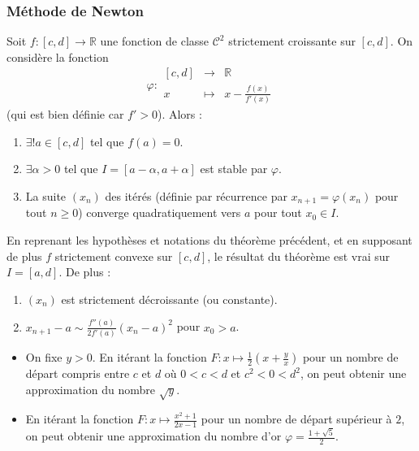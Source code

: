   \subsubsection{Méthode de Newton}


  \begin{theorem}
    Soit $f : [c, d] \rightarrow \mathbb{R}$ une fonction de classe $\mathcal{C}^2$ strictement croissante sur $[c, d]$. On considère la fonction
    \[ \varphi :
    \begin{array}{ccc}
      [c, d] &\rightarrow& \mathbb{R} \\
      x &\mapsto& x - \frac{f(x)}{f'(x)}
    \end{array}
    \]
    (qui est bien définie car $f' > 0$). Alors :
    \begin{enumerate}[label={\bfseries(\roman*)}]
      \item $\exists! a \in [c, d]$ tel que $f(a) = 0$.
      \item $\exists \alpha > 0$ tel que $I = [a - \alpha, a + \alpha]$ est stable par $\varphi$.
      \item La suite $(x_n)$ des itérés (définie par récurrence par $x_{n+1} = \varphi(x_n)$ pour tout $n \geq 0$) converge quadratiquement vers $a$ pour tout $x_0 \in I$.
    \end{enumerate}
  \end{theorem}

  \begin{corollary}
    En reprenant les hypothèses et notations du théorème précédent, et en supposant de plus $f$ strictement convexe sur $[c, d]$, le résultat du théorème est vrai sur $I = [a, d]$. De plus :
    \begin{enumerate}[label={\bfseries(\roman*)}]
      \item $(x_n)$ est strictement décroissante (ou constante).
      \item $x_{n+1} - a \sim \frac{f''(a)}{2f'(a)} (x_n - a)^2$ pour $x_0 > a$.
    \end{enumerate}
  \end{corollary}

  \begin{example}
    \begin{itemize}
      \item On fixe $y > 0$. En itérant la fonction $F : x \mapsto \frac{1}{2} \left( x + \frac{y}{x} \right)$ pour un nombre de départ compris entre $c$ et $d$ où $0 < c < d$ et $c^2 < 0 < d^2$, on peut obtenir une approximation du nombre $\sqrt{y}$.
      \item En itérant la fonction $F : x \mapsto \frac{x^2+1}{2x-1}$ pour un nombre de départ supérieur à $2$, on peut obtenir une approximation du nombre d'or $\varphi = \frac{1+\sqrt{5}}{2}$.
    \end{itemize}
  \end{example}

